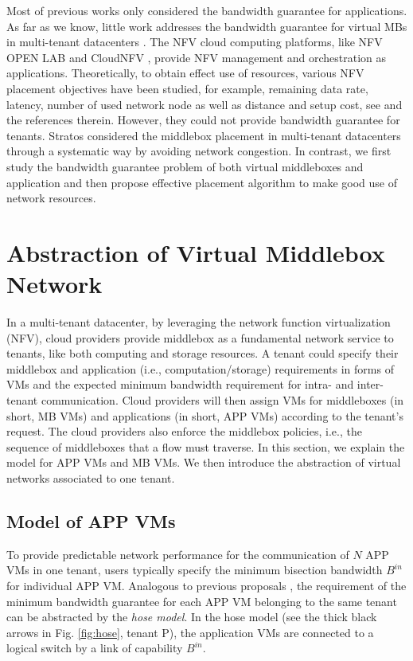 \documentclass[review]{elsarticle}
\begin{document}
Most of previous works only considered the bandwidth guarantee for applications. As far as we know, little work addresses the bandwidth guarantee for virtual MBs in multi-tenant datacenters \cite{7243304}. The NFV cloud computing platforms, like NFV OPEN LAB \cite{HuaweiNFV} and CloudNFV \cite{CloudNFV}, provide NFV management and orchestration as applications. Theoretically, to obtain effect use of resources, various NFV placement objectives have been studied, for example, remaining data rate, latency, number of used network node as well as distance and setup cost, see \cite{M14sap, cohen2015near} and the references therein. However, they could not provide bandwidth guarantee for tenants. Stratos \cite{stratos12} considered the middlebox placement in multi-tenant datacenters through a systematic way by avoiding network congestion. In contrast, we first study the bandwidth guarantee
 problem of both virtual middleboxes and application and then propose effective placement algorithm to make good use of network resources.

\section{Abstraction of Virtual Middlebox Network}\label{sec:abstraction}
In a multi-tenant datacenter, by leveraging the network function virtualization (NFV), cloud providers provide middlebox as a fundamental network service to tenants, like both computing and storage resources. A tenant could specify their middlebox and application (i.e., computation/storage) requirements in forms of VMs and the expected minimum bandwidth requirement for intra- and inter-tenant communication. Cloud providers will then assign VMs for middleboxes (in short, MB VMs) and applications (in short, APP VMs) according to the tenant's request. The cloud providers also enforce the middlebox policies, i.e., the sequence of middleboxes that a flow must traverse. In this section, we explain the model for APP VMs and MB VMs. We then introduce the abstraction of virtual networks associated to one tenant.


\subsection{Model of APP VMs}
To provide predictable network performance for the communication of $N$ APP VMs in one tenant, users typically specify the minimum bisection bandwidth $B^{in}$ for individual APP VM. Analogous to previous proposals \cite{B13cta, P12fst}, the requirement of the minimum bandwidth guarantee for each APP VM belonging to the same tenant can be abstracted by the \emph{hose model}. In the hose model (see the thick black arrows in Fig. \ref{fig:hose}, tenant P), the application VMs are connected to a logical switch by a link of capability $B^{in}$.
\end{document}
